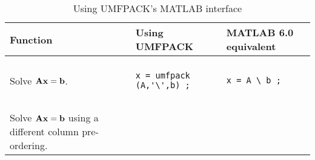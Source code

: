 \begin{table}
\caption{Using UMFPACK's MATLAB interface}
\label{matlab}
\vspace{0.1in}
{\footnotesize
\begin{tabular}{l|l|l}
\hline
Function & Using UMFPACK & MATLAB 6.0 equivalent \\
\hline
 & & \\
\begin{minipage}[t]{1.5in}
Solve ${\bf{Ax}}={\bf{b}}$.
\end{minipage}
&
\begin{minipage}[t]{2.2in}
\begin{verbatim}
x = umfpack (A,'\',b) ;
\end{verbatim}
\end{minipage}
&
\begin{minipage}[t]{2.2in}
\begin{verbatim}
x = A \ b ;
\end{verbatim}
\end{minipage}
 \\
 & & \\
\hline
 & & \\
\begin{minipage}[t]{1.5in}
Solve ${\bf{Ax}}={\bf{b}}$ using a different column pre-ordering.
\end{minipage}
&
\begin{minipage}[t]{2.2in}
\begin{verbatim}


\end{verbatim}
\end{minipage}
\end{tabular}}
\end{table}
